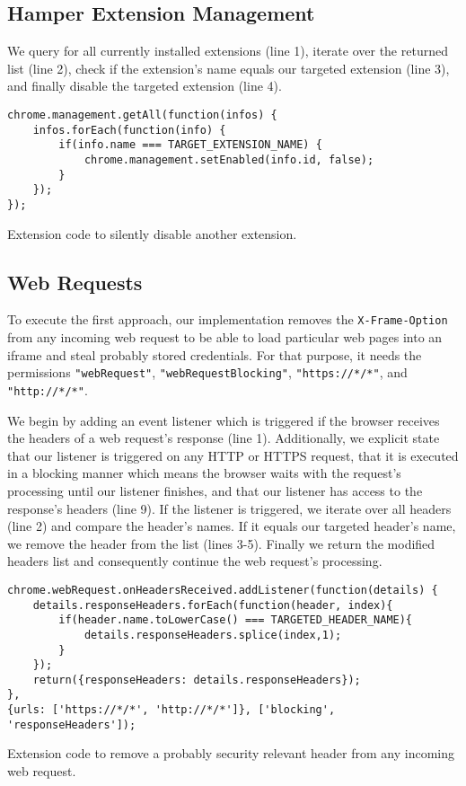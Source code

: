 \subsection{Hamper Extension Management}

	We query for all currently installed extensions (line 1), iterate over the returned list (line 2), check if the extension's name equals our targeted extension (line 3), and finally disable the targeted extension (line 4). 

	\begin{code}
		\begin{lstlisting}
chrome.management.getAll(function(infos) {
	infos.forEach(function(info) {
		if(info.name === TARGET_EXTENSION_NAME) {
			chrome.management.setEnabled(info.id, false);
		}
	});
});
\end{lstlisting}
		\caption{Extension code to silently disable another extension.}
	\end{code}





\subsection{Web Requests}

	To execute the first approach, our implementation removes the \texttt{X-Frame-Option} from any incoming web request to be able to load particular web pages into an iframe and steal probably stored credentials. For that purpose, it needs the permissions \texttt{"webRequest"}, \texttt{"webRequestBlocking"}, \texttt{"https://*/*"}, and \texttt{"http://*/*"}. 

	We begin by adding an event listener which is triggered if the browser receives the headers of a web request's response (line 1). Additionally, we explicit state that our listener is triggered on any HTTP or HTTPS request, that it is executed in a blocking manner which means the browser waits with the request's processing until our listener finishes, and that our listener has access to the response's headers (line 9). If the listener is triggered, we iterate over all headers (line 2) and compare the header's names. If it equals our targeted header's name, we remove the header from the list (lines 3-5). Finally we return the modified headers list and consequently continue the web request's processing. 

	\begin{code}
		\begin{lstlisting}
chrome.webRequest.onHeadersReceived.addListener(function(details) { 
	details.responseHeaders.forEach(function(header, index){
		if(header.name.toLowerCase() === TARGETED_HEADER_NAME){
			details.responseHeaders.splice(index,1);
		}
	});
	return({responseHeaders: details.responseHeaders});
},
{urls: ['https://*/*', 'http://*/*']}, ['blocking', 'responseHeaders']);
\end{lstlisting}
		\caption{Extension code to remove a probably security relevant header from any incoming web request.}
		\label{code:removeHTTPResponseHeader}
	\end{code} 


